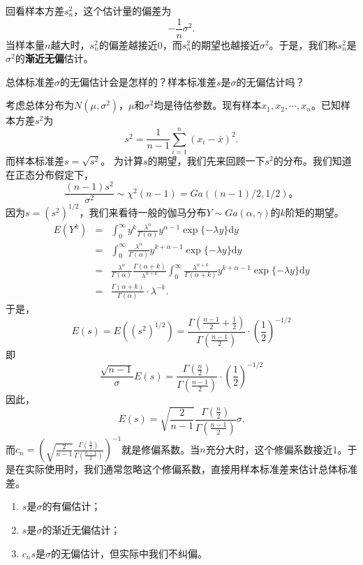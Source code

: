  \begin{remark}
 回看样本方差$s_n^2$，这个估计量的偏差为
 $$
 -\frac{1}{n}\sigma^2 .
 $$
 当样本量$n$越大时，$s_n^2$的偏差越接近0，而$s_n^2$的期望也越接近$\sigma^2$。于是，我们称$s_n^2$是$\sigma^2$的\textbf{渐近无偏}估计。
 \end{remark}

 \begin{problem}
    总体标准差$\sigma$的无偏估计会是怎样的？样本标准差$s$是$\sigma$的无偏估计吗？
\end{problem}
\begin{example}
    考虑总体分布为$N(\mu,\sigma^2)$，$\mu$和$\sigma^2$均是待估参数。现有样本$x_1,x_2,\cdots,x_n$。已知样本方差$s^2$为
    $$
    s^2 = \frac{1}{n-1}\sum_{i=1}^n (x_i-\bar{x})^2.
    $$
    而样本标准差$s = \sqrt{s^2}$。
    为计算$s$的期望，我们先来回顾一下$s^2$的分布。我们知道在正态分布假定下，
    $$
    \frac{(n-1)s^2}{\sigma^2} \sim \chi^2(n-1) = Ga((n-1)/2,1/2)。
    $$
    因为$s = (s^2)^{1/2}$，我们来看待一般的伽马分布$Y \sim Ga(\alpha,\gamma)$的$k$阶矩的期望。
\begin{eqnarray*}
E(Y^{k}) &=& \int_{0}^{\infty} y^{k} \frac{\lambda^{\alpha}}{\Gamma(\alpha)} y^{\alpha - 1} \exp\{-\lambda y\} \text{d} y\\
     &=& \int_{0}^{\infty} \frac{\lambda^{\alpha}}{\Gamma(\alpha)} y^{k+\alpha - 1} \exp\{-\lambda y\} \text{d} y\\
     &=&\frac{\lambda^{\alpha}}{\Gamma(\alpha)}\frac{\Gamma(\alpha + k)} {\lambda^{\alpha +k}} \int_{0}^{\infty} \frac{\lambda^{\alpha +k}}{\Gamma(\alpha + k)} y^{k+\alpha - 1} \exp\{-\lambda y\} \text{d} y\\
     &=& \frac{\Gamma(\alpha + k)}{\Gamma(\alpha)} \cdot \lambda^{-k}.
\end{eqnarray*}
于是，$$
E(s) = E\left((s^2)^{1/2}\right) = \frac{\Gamma\left(\frac{n-1}{2}+\frac{1}{2}\right)}{\Gamma(\frac{n-1}{2})} \cdot \left(\frac{1}{2}\right)^{-1/2}
$$
即
$$
\frac{\sqrt{n-1}}{\sigma} E(s) = \frac{\Gamma\left(\frac{n}{2}\right)}{\Gamma(\frac{n-1}{2})} \cdot \left(\frac{1}{2}\right)^{-1/2}
$$
因此，
$$
E(s) = \sqrt{\frac{2}{n-1}} \frac{\Gamma\left(\frac{n}{2}\right)}{\Gamma\left(\frac{n-1}{2}\right)} \sigma .
$$
而$c_n = \left(\sqrt{\frac{2}{n-1}} \frac{\Gamma\left(\frac{n}{2}\right)}{\Gamma\left(\frac{n-1}{2}\right)}\right)^{-1}$就是修偏系数。当$n$充分大时，这个修偏系数接近1。于是在实际使用时，我们通常忽略这个修偏系数，直接用样本标准差来估计总体标准差。
\end{example}
\begin{remark}
    \begin{enumerate}
        \item $s$是$\sigma$的有偏估计；
        \item $s$是$\sigma$的渐近无偏估计；
        \item $c_n s$是$\sigma$的无偏估计，但实际中我们不纠偏。
    \end{enumerate}
\end{remark}



